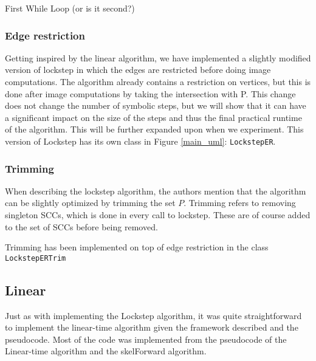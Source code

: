 \documentclass[../master/master.tex]{subfiles}
\begin{document}
\begin{algorithm}[H]
  \caption{First While Loop (or is it second?)}
  \begin{algorithmic}
      \EndWhile
      \Else
      \EndWhile
    \EndIf
  \end{algorithmic}
\end{algorithm}

\subsubsection{Edge restriction}
Getting inspired by the linear algorithm, we have implemented a slightly modified version of lockstep in which the edges are restricted before doing image computations. The algorithm already contains a restriction on vertices, but this is done after image computations by taking the intersection with P. This change does not change the number of symbolic steps, but we will show that it can have a significant impact on the size of the steps and thus the final practical runtime of the algorithm. This will be further expanded upon when we experiment. This version of Lockstep has its own class in Figure \ref{main_uml}: \texttt{LockstepER}.

\subsubsection{Trimming}
When describing the lockstep algorithm\cite{lockstep}, the authors mention that the algorithm can be slightly optimized by trimming the set $P$. Trimming refers to removing singleton SCCs, which is done in every call to lockstep. These are of course added to the set of SCCs before being removed.

Trimming has been implemented on top of edge restriction in the class 
\texttt{LockstepERTrim}

\subsection{Linear}
Just as with implementing the Lockstep algorithm, it was quite straightforward to implement the linear-time algorithm given the framework described and the pseudocode. Most of the code was implemented from the pseudocode of the Linear-time algorithm and the skelForward algorithm.
\end{document}
